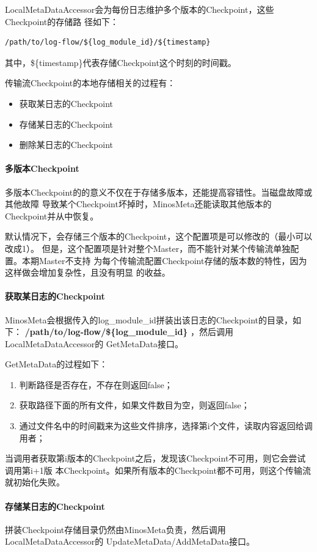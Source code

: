 \documentclass[11pt]{article}
\begin{document}
LocalMetaDataAccessor会为每份日志维护多个版本的Checkpoint，这些Checkpoint的存储路
径如下：
\begin{verbatim}
/path/to/log-flow/${log_module_id}/${timestamp}
\end{verbatim}
其中，\$\{timestamp\}代表存储Checkpoint这个时刻的时间戳。

传输流Checkpoint的本地存储相关的过程有：
\begin{itemize}
\item 获取某日志的Checkpoint
\item 存储某日志的Checkpoint
\item 删除某日志的Checkpoint
\end{itemize}

\paragraph{多版本Checkpoint}
\label{sec-2-2-1-1}
多版本Checkpoint的的意义不仅在于存储多版本，还能提高容错性。当磁盘故障或其他故障
导致某个Checkpoint坏掉时，MinosMeta还能读取其他版本的Checkpoint并从中恢复。

默认情况下，会存储三个版本的Checkpoint，这个配置项是可以修改的（最小可以改成1）。
但是，这个配置项是针对整个Master，而不能针对某个传输流单独配置。本期Master不支持
为每个传输流配置Checkpoint存储的版本数的特性，因为这样做会增加复杂性，且没有明显
的收益。
\paragraph{获取某日志的Checkpoint}
\label{sec-2-2-1-2}
MinosMeta会根据传入的log\_module\_id拼装出该日志的Checkpoint的目录，如下：
\textbf{/path/to/log-flow/\$\{log\_module\_id\}} ，然后调用LocalMetaDataAccessor的
GetMetaData接口。

GetMetaData的过程如下：
\begin{enumerate}
\item 判断路径是否存在，不存在则返回false；
\item 获取路径下面的所有文件，如果文件数目为空，则返回false；
\item 通过文件名中的时间戳来为这些文件排序，选择第i个文件，读取内容返回给调用者；
\end{enumerate}

当调用者获取第i版本的Checkpoint之后，发现该Checkpoint不可用，则它会尝试调用第i+1版
本Checkpoint。如果所有版本的Checkpoint都不可用，则这个传输流就初始化失败。
\paragraph{存储某日志的Checkpoint}
\label{sec-2-2-1-3}
拼装Checkpoint存储目录仍然由MinosMeta负责，然后调用LocalMetaDataAccessor的
UpdateMetaData/AddMetaData接口。
\end{document}
